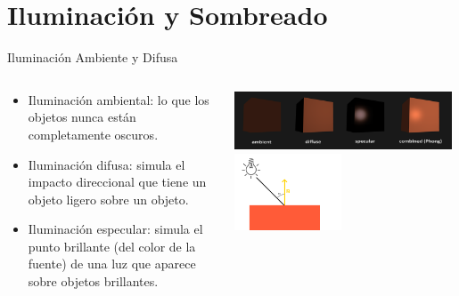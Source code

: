 \documentclass[aspectratio=169,compress]{beamer}
\begin{document}
\section[Iluminación]{Iluminación y Sombreado}
\begin{frame}{Iluminación Ambiente y Difusa}
\begin{columns}
\begin{column}{0.5\textwidth}
\begin{itemize}
\item Iluminación ambiental: lo que los objetos nunca están completamente oscuros. 
\item Iluminación difusa: simula el impacto direccional que tiene un objeto ligero sobre un objeto. 
\item Iluminación especular: simula el punto brillante (del color de la fuente) de una luz que aparece sobre objetos brillantes.
\end{itemize}
\end{column}
\begin{column}{0.5\textwidth}
\begin{center}
 \includegraphics[width=0.98\textwidth]{FigsOpenGL/basic_lighting_phong}\\
 \includegraphics[width=0.48\textwidth]{FigsOpenGL/diffuse_light}
 \end{center}
\end{column}
\end{columns}
\end{frame}
\end{document}
